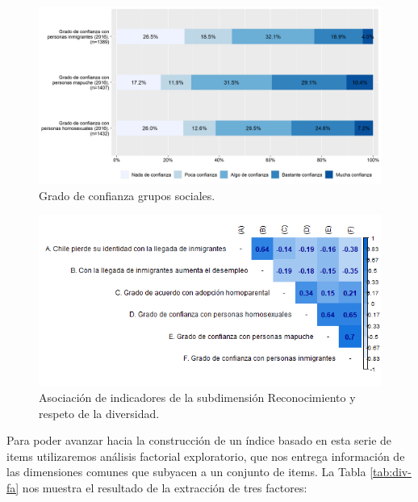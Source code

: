 \documentclass[
  12pt,
]{book}
\begin{document}
\begin{figure}[H]

{\centering \includegraphics[width=1\linewidth,height=1\textheight]{output/graphs/diversidad} 

}

\caption{Grado de confianza grupos sociales.}\label{fig:diversidad}
\end{figure}

\begin{figure}[H]

{\centering \includegraphics[width=1\linewidth,height=1\textheight]{output/graphs/diversidad_cor} 

}

\caption{Asociación de indicadores de la subdimensión Reconocimiento y respeto de la diversidad.}\label{fig:diversidad-cor}
\end{figure}

Para poder avanzar hacia la construcción de un índice basado en esta serie de items utilizaremos análisis factorial exploratorio, que nos entrega información de las dimensiones comunes que subyacen a un conjunto de items. La Tabla \ref{tab:div-fa} nos muestra el resultado de la extracción de tres factores:
\end{document}
